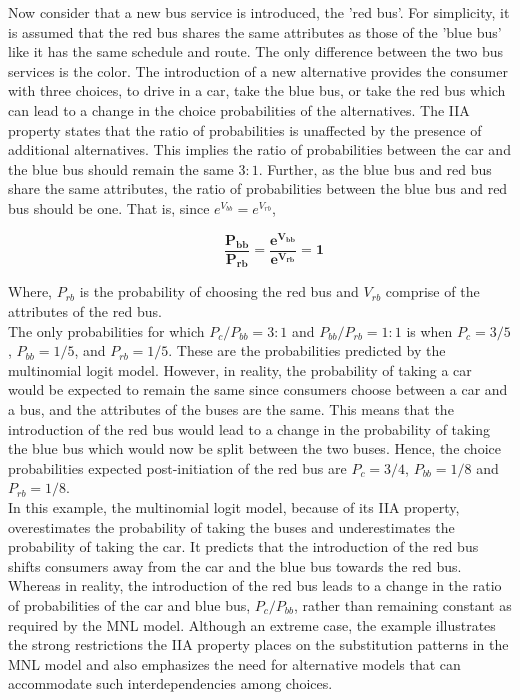 \documentclass[a4paper,11pt]{article}
\begin{document}
    Now consider that a new bus service is introduced, the 'red bus'. For simplicity, it is assumed that the red bus shares the same attributes as those of the 'blue bus' like it has the same schedule and route. The only difference between the two bus services is the color. The introduction of a new alternative provides the consumer with three choices, to drive in a car, take the blue bus, or take the red bus which can lead to a change in the choice probabilities of the alternatives. The IIA property states that the ratio of probabilities is unaffected by the presence of additional alternatives. This implies the ratio of probabilities between the car and the blue bus should remain the same $3:1$. Further, as the blue bus and red bus share the same attributes, the ratio of probabilities between the blue bus and red bus should be one. That is, since $e^{V_{bb}} = e^{V_{rb}}$,

    \begin{equation*}
        \qquad \mathbf{\dfrac{P_{bb}}{P_{rb}}  = \dfrac{e^{V_{bb}}}{e^{V_{rb}}} = 1}
    \end{equation*}

    Where, $P_{rb}$ is the probability of choosing the red bus and $V_{rb}$ comprise of the attributes of the red bus.\\

    The only probabilities for which $P_{c}/P_{bb} = 3:1$ and $P_{bb}/P_{rb} = 1:1$ is when $P_{c} = 3/5$, $P_{bb} = 1/5$, and $P_{rb} = 1/5$. These are the probabilities predicted by the multinomial logit model. However, in reality, the probability of taking a car would be expected to remain the same since consumers choose between a car and a bus, and the attributes of the buses are the same. This means that the introduction of the red bus would lead to a change in the probability of taking the blue bus which would now be split between the two buses. Hence, the choice probabilities expected post-initiation of the red bus are $P_{c} = 3/4$, $P_{bb} = 1/8$ and $P_{rb} = 1/8$.\\
    
    In this example, the multinomial logit model, because of its IIA property, overestimates the probability of taking the buses and underestimates the probability of taking the car. It predicts that the introduction of the red bus shifts consumers away from the car and the blue bus towards the red bus. Whereas in reality, the introduction of the red bus leads to a change in the ratio of probabilities of the car and blue bus, $P_{c}/P_{bb}$, rather than remaining constant as required by the MNL model. Although an extreme case, the example illustrates the strong restrictions the IIA property places on the substitution patterns in the MNL model and also emphasizes the need for alternative models that can accommodate such interdependencies among choices.\\
\end{document}
